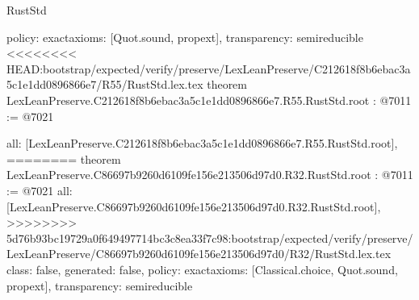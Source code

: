 \begin{lexlean}{RustStd}
\begin{coremodule}
{\begin{coremodule}
{{{{{{{{{{  policy: exact{axioms: [Quot.sound, propext]},
  transparency: semireducible
}
<<<<<<<< HEAD:bootstrap/expected/verify/preserve/LexLeanPreserve/C212618f8b6ebac3a5c1e1dd0896866e7/R55/RustStd.lex.tex
theorem LexLeanPreserve.C212618f8b6ebac3a5c1e1dd0896866e7.R55.RustStd.root : @7011 := @7021 {
  all: [LexLeanPreserve.C212618f8b6ebac3a5c1e1dd0896866e7.R55.RustStd.root],
========
theorem LexLeanPreserve.C86697b9260d6109fe156e213506d97d0.R32.RustStd.root : @7011 := @7021 {
  all: [LexLeanPreserve.C86697b9260d6109fe156e213506d97d0.R32.RustStd.root],
>>>>>>>> 5d76b93bc19729a0f649497714bc3c8ea33f7c98:bootstrap/expected/verify/preserve/LexLeanPreserve/C86697b9260d6109fe156e213506d97d0/R32/RustStd.lex.tex
  class: false,
  generated: false,
  policy: exact{axioms: [Classical.choice, Quot.sound, propext]},
  transparency: semireducible
}

}}}}}}}}}}
\end{coremodule}}
\end{coremodule}
\end{lexlean}
